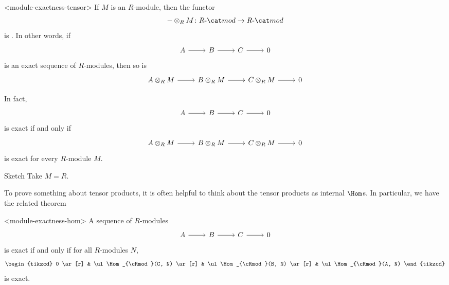 \documentclass{standalone}
\begin{document}
\begin{proposition}<module-exactness-tensor>
  If \(M\) is an \(R\)-module, then the functor
  \[
    {-} \otimes_R M \colon \cRmod \to \cRmod
  \]
  is .
  In other words, if
  \[
    \begin{tikzcd}
    	A \ar[r] &
    	B \ar[r] &
    	C \ar[r] &
    	0
    \end{tikzcd}
  \]
  is an exact sequence of \(R\)-modules, then so is
  \[
    \begin{tikzcd}
    	A \otimes_R M \ar[r] &
    	B \otimes_R M \ar[r] &
    	C \otimes_R M \ar[r] &
    	0
    \end{tikzcd}
  \]
\end{proposition}
\begin{corollary}
  In fact,
  \[
    \begin{tikzcd}
    	A \ar[r] &
    	B \ar[r] &
    	C \ar[r] &
    	0
    \end{tikzcd}
  \]
  is exact if and only if
  \[
    \begin{tikzcd}
    	A \otimes_R M \ar[r] &
    	B \otimes_R M \ar[r] &
    	C \otimes_R M \ar[r] &
    	0
    \end{tikzcd}
  \]
  is exact for every \(R\)-module \(M\).
\end{corollary}
\begin{proof*}{Sketch}
  Take \(M = R\).
\end{proof*}

To prove something about tensor products,
it is often helpful to think about
the tensor products as internal \(\Hom\)s.
In particular, we have the related theorem
\begin{proposition}<module-exactness-hom>
  A sequence of \(R\)-modules
  \[
    \begin{tikzcd}
    	A \ar[r] &
    	B \ar[r] &
    	C \ar[r] &
    	0
    \end{tikzcd}
  \]
  is exact if and only if for all \(R\)-modules \(N\),
  \[
    \begin{tikzcd}
    	0 \ar[r] &
    	\ul\Hom_{\cRmod}(C, N) \ar[r] &
    	\ul\Hom_{\cRmod}(B, N) \ar[r] &
    	\ul\Hom_{\cRmod}(A, N)
    \end{tikzcd}
  \]
  is exact.
\end{proposition}
\end{document}
